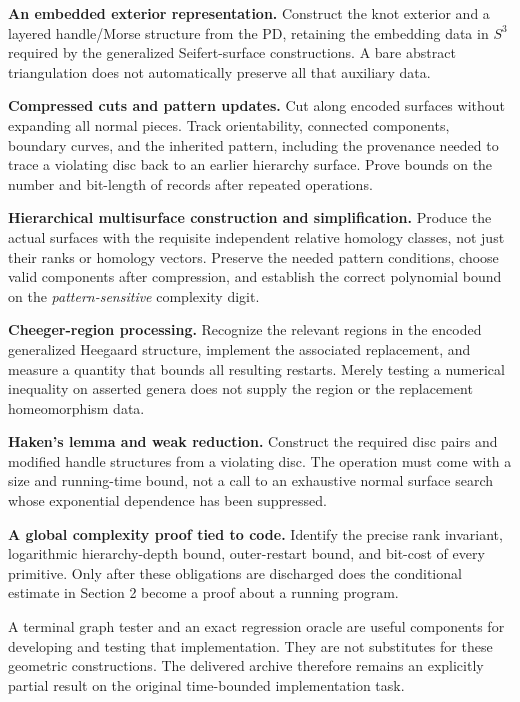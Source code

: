 \documentclass[11pt]{article}
\theoremstyle{definition}\newtheorem{definition}[theorem]{Definition}
\begin{document}
\textbf{An embedded exterior representation.} Construct the knot exterior and
a layered handle/Morse structure from the PD, retaining the embedding data in
$S^3$ required by the generalized Seifert-surface constructions. A bare abstract
triangulation does not automatically preserve all that auxiliary data.

\textbf{Compressed cuts and pattern updates.} Cut along encoded surfaces
without expanding all normal pieces. Track orientability, connected components,
boundary curves, and the inherited pattern, including the provenance needed to
trace a violating disc back to an earlier hierarchy surface. Prove bounds on
the number and bit-length of records after repeated operations.

\textbf{Hierarchical multisurface construction and simplification.} Produce
the actual surfaces with the requisite independent relative homology classes,
not just their ranks or homology vectors. Preserve the needed pattern
conditions, choose valid components after compression, and establish the
correct polynomial bound on the \emph{pattern-sensitive} complexity digit.

\textbf{Cheeger-region processing.} Recognize the relevant regions in the
encoded generalized Heegaard structure, implement the associated replacement,
and measure a quantity that bounds all resulting restarts. Merely testing a
numerical inequality on asserted genera does not supply the region or the
replacement homeomorphism data.

\textbf{Haken's lemma and weak reduction.} Construct the required disc pairs
and modified handle structures from a violating disc. The operation must
come with a size and running-time bound, not a call to an exhaustive normal
surface search whose exponential dependence has been suppressed.

\textbf{A global complexity proof tied to code.} Identify the precise rank
invariant, logarithmic hierarchy-depth bound, outer-restart bound, and bit-cost
of every primitive. Only after these obligations are discharged does the
conditional estimate in Section 2 become a proof about a running program.

A terminal graph tester and an exact regression oracle are useful components
for developing and testing that implementation. They are not substitutes for
these geometric constructions. The delivered archive therefore remains an
explicitly partial result on the original time-bounded implementation task.
\end{document}
